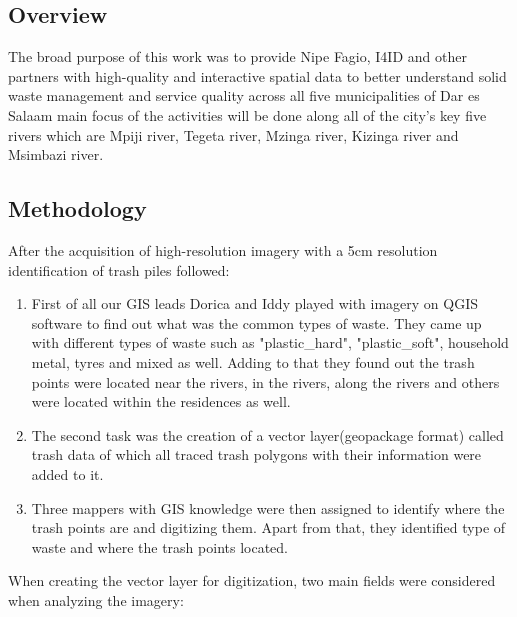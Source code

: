 \documentclass[a4paper,12pt,twoside]{article}
\begin{document}
\subsection{Overview}
    The broad purpose of this work was to provide Nipe Fagio, I4ID and other partners with high-quality and interactive spatial data to better understand solid waste management and service quality across all five municipalities of Dar es Salaam main focus of the activities will be done along all of the city’s key five rivers which are Mpiji river, Tegeta river, Mzinga river, Kizinga river and Msimbazi river.

\subsection{Methodology}
    After the acquisition of high-resolution imagery with a 5cm resolution identification of trash piles followed:
    
        \begin{enumerate}
            \item First of all our GIS leads Dorica and Iddy played with imagery on QGIS software to find out what was the common types of waste. They came up with different types of waste such as "plastic_hard", "plastic_soft", household metal, tyres and mixed as well.
            Adding to that they found out the trash points were located near the rivers, in the rivers, along the rivers and others were located within the residences as well.
            \item The second task was the creation of a vector layer(geopackage format) called trash data of which all traced trash polygons with their information were added to it. 
            \item Three mappers with GIS knowledge were then assigned to identify where the trash points are and digitizing them. Apart from that, they identified type of waste and where the trash points located.
        \end{enumerate}
    
    When creating the vector layer for digitization, two main fields were considered when analyzing the imagery:
    
\end{document}
